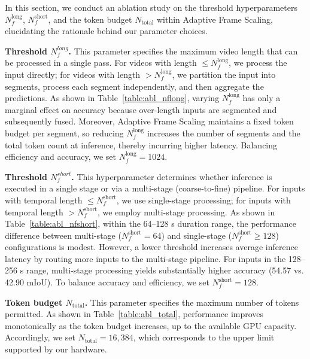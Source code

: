 In this section, we conduct an ablation study on the threshold hyperparameters $N_f^{\text{long}}$, $N_f^{\text{short}}$, and the token budget $N_{\text{total}}$ within Adaptive Frame Scaling, elucidating the rationale behind our parameter choices.

\noindent \textbf{Threshold $N_f^{long}$.} This parameter specifies the maximum video length that can be processed in a single pass.
For videos with length $\leq N_f^{\text{long}}$, we process the input directly; for videos with length $> N_f^{\text{long}}$, we partition the input into segments, process each segment independently, and then aggregate the predictions. As shown in Table~\ref{table:abl_nflong}, varying $N_f^{\text{long}}$ has only a marginal effect on accuracy because over-length inputs are segmented and subsequently fused. Moreover, Adaptive Frame Scaling maintains a fixed token budget per segment, so reducing $N_f^{\text{long}}$ increases the number of segments and the total token count at inference, thereby incurring higher latency. Balancing efficiency and accuracy, we set $N_f^{\text{long}}=1024$.

\noindent \textbf{Threshold $N_f^{short}$.} This hyperparameter determines whether inference is executed in a single stage or via a multi-stage (coarse-to-fine) pipeline. For inputs with temporal length $\leq N_f^{\text{short}}$, we use single-stage processing; for inputs with temporal length $> N_f^{\text{short}}$, we employ multi-stage processing. As shown in Table~\ref{table:abl_nfshort}, within the 64–128 s duration range, the performance difference between multi-stage ($N_f^{\text{short}}{=}64$) and single-stage ($N_f^{\text{short}}\geq 128$) configurations is modest. However, a lower threshold increases average inference latency by routing more inputs to the multi-stage pipeline. For inputs in the 128–256 s range, multi-stage processing yields substantially higher accuracy (54.57 vs. 42.90 mIoU). To balance accuracy and efficiency, we set $N_f^{\text{short}}{=}128$.

\noindent \textbf{Token budget $N_{\text{total}}$.} This parameter specifies the maximum number of tokens permitted. As shown in Table~\ref{table:abl_total}, performance improves monotonically as the token budget increases, up to the available GPU capacity. Accordingly, we set $N_{\text{total}}=16,384$, which corresponds to the upper limit supported by our hardware.

